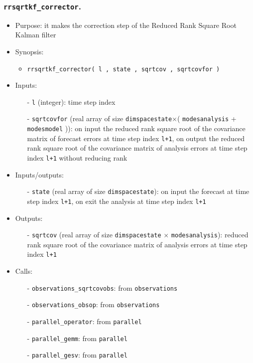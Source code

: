\documentclass[12pt]{article}
\begin{document}
\subsubsection{{\tt rrsqrtkf\_corrector}.} 
\begin{itemize}
\item Purpose: it makes the correction step of the Reduced Rank Square Root Kalman filter
\item Synopsis: 
\begin{itemize}
\item {\tt rrsqrtkf\_corrector( l , state , sqrtcov , sqrtcovfor )} 
\end{itemize}
\item Inputs: 
\begin{itemize}
\item[-] {\tt l} (integer): time step index
\item[-] {\tt sqrtcovfor} (real array of size {\tt dimspacestate}$\times$( {\tt modesanalysis} + {\tt modesmodel} )): on input the reduced rank square root of the covariance matrix of forecast errors at time step index {\tt l+1}, on output the reduced rank square root of the covariance matrix of analysis errors at time step index {\tt l+1} without reducing rank
\end{itemize}
\item Inputs/outputs: 
\begin{itemize}
\item[-] {\tt state} (real array of size {\tt dimspacestate}): on input the forecast at time step index {\tt l+1}, on exit the analysis at time step index {\tt l+1}
\end{itemize}
\item Outputs: 
\begin{itemize}
\item[-] {\tt sqrtcov} (real array of size {\tt dimspacestate} $\times$ {\tt modesanalysis}): reduced rank square root of the covariance matrix of analysis errors at time step index {\tt l+1}
\end{itemize}
\item Calls: 
\begin{itemize}
\item[-] {\tt observations\_sqrtcovobs}: from {\tt observations}
\item[-] {\tt observations\_obsop}: from {\tt observations}
\item[-] {\tt parallel\_operator}: from {\tt parallel}
\item[-] {\tt parallel\_gemm}: from {\tt parallel}
\item[-] {\tt parallel\_gesv}: from {\tt parallel}

\end{itemize}
\end{itemize}
\end{document}
